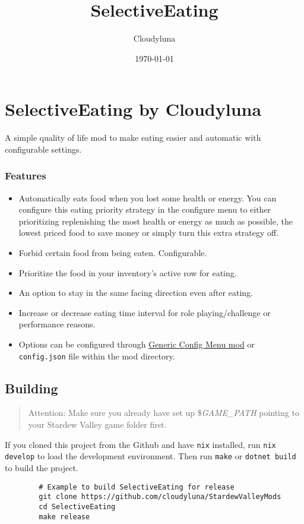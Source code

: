 \documentclass[a4paper,12pt]{article}
\title{SelectiveEating}
\author{Cloudyluna}
\date{\today}
\begin{document}
	
	\section{SelectiveEating by Cloudyluna}
	
	A simple quality of life mod to make eating easier and automatic with configurable settings.
	
	\subsubsection{Features}
	
	\begin{itemize}
		\item Automatically eats food when you lost some health or energy. You can configure this eating priority strategy in the configure menu to either prioritizing replenishing the most health or energy as much as possible, the lowest priced food to save money or simply turn this extra strategy off.
		\item Forbid certain food from being eaten. Configurable.
		\item Prioritize the food in your inventory's active row for eating.
		\item An option to stay in the same facing direction even after eating.
		\item Increase or decrease eating time interval for role playing/challenge or performance reasons.
		\item Options can be configured through \href{https://www.nexusmods.com/stardewvalley/mods/5098}{Generic Config Menu mod} or \texttt{config.json} file within the mod directory.
	\end{itemize}
	
	
	\subsection{Building}
	
	\begin{quote}
		Attention: Make sure you already have set up \$\textit{GAME\_PATH} pointing to your Stardew Valley game folder first.
	\end{quote}

	If you cloned this project from the Github and have \texttt{nix} installed, run \texttt{nix develop} to load the development environment. Then run \texttt{make} or \texttt{dotnet build} to build the project.
	
	\begin{verbatim}
		# Example to build SelectiveEating for release
		git clone https://github.com/cloudyluna/StardewValleyMods
		cd SelectiveEating
		make release
	\end{verbatim}
	
\end{document}
